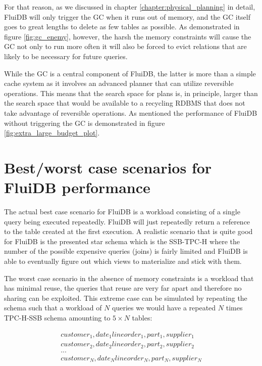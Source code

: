  For that reason, as we discussed in chapter
  \ref{chapter:physical_planning} in detail, FluiDB will only trigger
  the GC when it runs out of memory, and the GC itself goes to great
  lengths to delete as few tables as possible. As demonstrated in
  figure \ref{fig:gc_enemy}, however, the harsh the memory constraints
  will cause the GC not only to run more often it will also be forced
  to evict relations that are likely to be necessary for future
  queries.

  While the GC is a central component of FluiDB, the latter is more than
  a simple cache system as it involves an advanced planner that can
  utilize reversible operations. This means that the search space for
  plans is, in principle, larger than the search space that would be
  available to a recycling RDBMS that does not take advantage of
  reversible operations. As mentioned the performance of FluiDB without
  triggering the GC is demonstrated in figure
  \ref{fig:extra_large_budget_plot}.


  \section{Best/worst case scenarios for FluiDB performance}

  The actual best case scenario for FluiDB is a workload consisting of
  a single query being executed repeatedly. FluiDB will just repeatedly
  return a reference to the table created at the first execution. A
  realistic scenario that is quite good for FluiDB is the presented
  star schema which is the SSB-TPC-H where the number of the possible
  expensive queries (joins) is fairly limited and FluiDB is able to
  eventually figure out which views to materialize and stick with
  them.

  The worst case scenario in the absence of memory constraints is a
  workload that has minimal reuse, the queries that reuse are very far
  apart and therefore no sharing can be exploited. This extreme case
  can be simulated by repeating the schema such that a workload of
  \(N\) queries we would have a repeated \(N\) times TPC-H-SSB schema
  amounting to \(5 \times N\) tables:


  \begin{align*}
    customer_1, date_1 lineorder_1, part_1, supplier_1 \\
    customer_2, date_2 lineorder_2, part_2, supplier_2 \\
    ... \\
    customer_N, date_N lineorder_N, part_N, supplier_N \\
  \end{align*}

